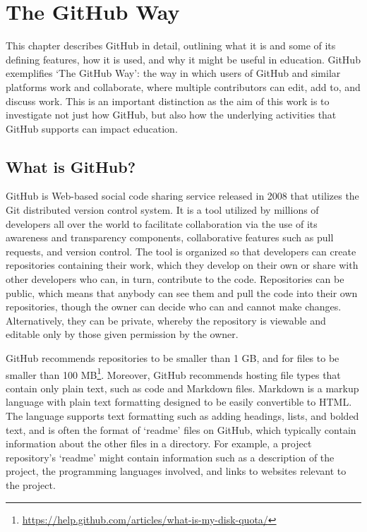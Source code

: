 \chapter{The GitHub Way}
This chapter describes GitHub in detail, outlining what it is and some of its defining features, how it is used, and why it might be useful in education. GitHub exemplifies `The GitHub Way': the way in which users of GitHub and similar platforms work and collaborate, where multiple contributors can edit, add to, and discuss work. This is an important distinction as the aim of this work is to investigate not just how GitHub, but also how the underlying activities that GitHub supports can impact education. %

\section{What is GitHub?}
GitHub is Web-based social code sharing service released in 2008 that utilizes the Git distributed version control system. It is a tool utilized by millions of developers all over the world to facilitate collaboration via the use of its awareness and transparency components, collaborative features such as pull requests, and version control. The tool is organized so that developers can create repositories containing their work, which they develop on their own or share with other developers who can, in turn, contribute to the code. Repositories can be public, which means that anybody can see them and pull the code into their own repositories, though the owner can decide who can and cannot make changes. Alternatively, they can be private, whereby the repository is viewable and editable only by those given permission by the owner.

 GitHub recommends repositories to be smaller than 1 GB, and for files to be smaller than 100 MB\footnote{\url{https://help.github.com/articles/what-is-my-disk-quota/}}. Moreover, GitHub recommends hosting file types that contain only plain text, such as code and Markdown files. Markdown is a markup language with plain text formatting designed to be easily convertible to HTML. The language supports text formatting such as adding headings, lists, and bolded text, and is often the format of `readme' files on GitHub, which typically contain information about the other files in a directory. For example, a project repository's `readme' might contain information such as a description of the project, the programming languages involved, and links to websites relevant to the project.

